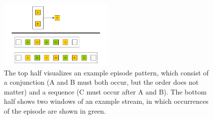 \begin{figure}[h]
	\centering
  	\includegraphics[width=0.5\textwidth]{exampleEpisode.jpg}
	\caption{The top half visualizes an example episode pattern, which consist of a conjunction (A and B must both occur, but the order does not matter) and a sequence (C must occur after A and B). The bottom half shows two windows of an example stream, in which occurrences of the episode are shown in green.}
	\label{fig_simpleEpisodeExample}
\end{figure}

